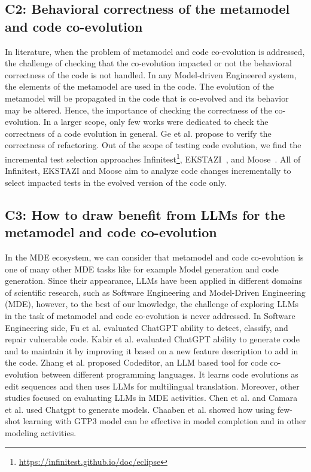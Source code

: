  

\subsection*{C2: Behavioral correctness of the metamodel and code co-evolution}

In literature, when the problem of metamodel and code co-evolution is addressed, the challenge of checking that the co-evolution impacted or not the behavioral correctness of the code is not handled. In any Model-driven Engineered system, the elements of the metamodel are used in the code. The evolution of the metamodel will be propagated in the code that is co-evolved and its behavior may be altered. Hence, the importance of checking the correctness of the co-evolution. In a larger scope, only few works were dedicated to check the correctness of a code evolution in general. %
 Ge et al. \cite{10.1145/2568225.2568280} propose to verify the correctness of refactoring.
Out of the scope of testing code evolution, we find the incremental test selection approaches Infinitest\footnote{\url{https://infinitest.github.io/doc/eclipse}}, EKSTAZI~\cite{7203050}, and Moose~\cite{ducasse2000moose}. All of Infinitest, EKSTAZI and Moose aim to analyze code changes incrementally to select impacted tests in the evolved version of the code only.

\subsection*{C3: How to draw benefit from LLMs for the metamodel and code co-evolution}
In the MDE ecosystem, we can consider that metamodel and code co-evolution is one of many other MDE tasks like for example Model generation and code generation. Since their appearance, LLMs have been applied in different domains of scientific research, such as Software Engineering and Model-Driven Engineering (MDE), however, to the best of our knowledge, the challenge of exploring LLMs in the task of metamodel and code co-evolution is never addressed. In Software Engineering side, Fu et al. \cite{fu2023chatgpt} evaluated ChatGPT ability to detect, classify, and repair vulnerable code. Kabir et al. \cite{kabir2023empirical} evaluated ChatGPT ability to generate code and to maintain it by improving it based on a new feature description to add in the code. Zhang et al. \cite{zhang2023multilingual} proposed Codeditor, an LLM based tool for code co-evolution between different programming languages. It learns code evolutions as edit sequences and then uses LLMs for multilingual translation.
Moreover, other studies focused on evaluating LLMs in MDE activities. 
Chen et al. \cite{10344012} and Camara et al. \cite{camara2023assessment} used Chatgpt to generate models.
Chaaben et al. \cite{chaaben2023towards} showed how using few-shot learning with GTP3 model can be effective in model completion and in other modeling activities. 
%
